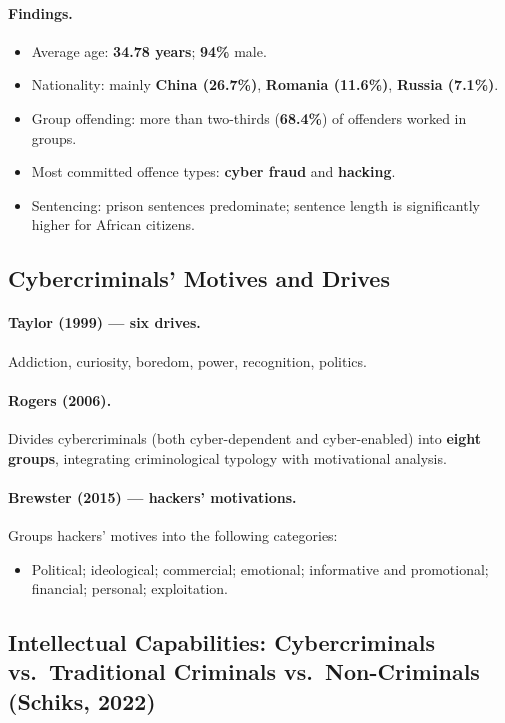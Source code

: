 \documentclass[11pt,a4paper,openany]{report}
\theoremstyle{definition}
\theoremstyle{plain}
\theoremstyle{remark}
\begin{document}
\paragraph{Findings.}
\begin{itemize}
    \item Average age: \textbf{34.78 years}; \textbf{94\%} male.
    \item Nationality: mainly \textbf{China (26.7\%)}, \textbf{Romania (11.6\%)}, \textbf{Russia (7.1\%)}.
    \item Group offending: more than two-thirds (\textbf{68.4\%}) of offenders worked in groups.
    \item Most committed offence types: \textbf{cyber fraud} and \textbf{hacking}.
    \item Sentencing: prison sentences predominate; sentence length is significantly higher for African citizens.
\end{itemize}

\subsection{Cybercriminals' Motives and Drives}

\paragraph{Taylor (1999) --- six drives.} Addiction, curiosity, boredom, power, recognition, politics.

\paragraph{Rogers (2006).} Divides cybercriminals (both cyber-dependent and cyber-enabled) into \textbf{eight groups}, integrating criminological typology with motivational analysis.

\paragraph{Brewster (2015) --- hackers' motivations.} Groups hackers' motives into the following categories:
\begin{itemize}
    \item Political; ideological; commercial; emotional; informative and promotional; financial; personal; exploitation.
\end{itemize}

\subsection{Intellectual Capabilities: Cybercriminals vs.\ Traditional Criminals vs.\ Non-Criminals (Schiks, 2022)}
\end{document}

